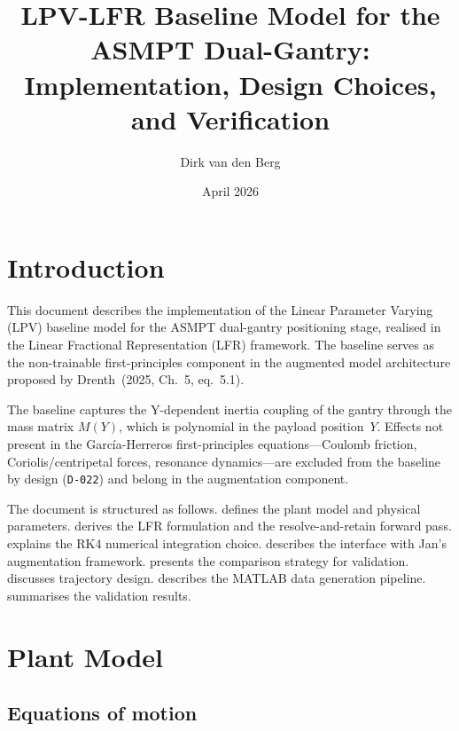 \documentclass[11pt,a4paper]{article}
\title{LPV-LFR Baseline Model for the ASMPT Dual-Gantry:\\
Implementation, Design Choices, and Verification}
\author{Dirk van den Berg}
\date{April 2026}
\newcommand{\decref}[1]{\texttt{D-#1}}
\begin{document}
\maketitle

\tableofcontents
\newpage

\section{Introduction}
\label{sec:intro}

This document describes the implementation of the Linear Parameter Varying (LPV) baseline
model for the ASMPT dual-gantry positioning stage, realised in the Linear Fractional
Representation (LFR) framework. The baseline serves as the non-trainable first-principles
component in the augmented model architecture proposed by Drenth~(2025, Ch.~5, eq.~5.1).

The baseline captures the Y-dependent inertia coupling of the gantry through the mass matrix
$M(Y)$, which is polynomial in the payload position~$Y$. Effects not present in the
Garc\'ia-Herreros first-principles equations---Coulomb friction, Coriolis/centripetal forces,
resonance dynamics---are excluded from the baseline by design (\decref{022}) and belong in the
augmentation component.

The document is structured as follows.
 defines the plant model and physical parameters.
 derives the LFR formulation and the resolve-and-retain forward pass.
 explains the RK4 numerical integration choice.
 describes the interface with Jan's augmentation framework.
 presents the comparison strategy for validation.
 discusses trajectory design.
 describes the MATLAB data generation pipeline.
 summarises the validation results.


\section{Plant Model}
\label{sec:plant}

\subsection{Equations of motion}
\end{document}
